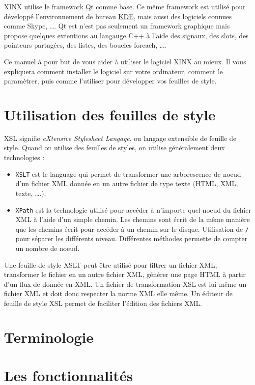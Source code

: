 \documentclass[a4paper,10pt,twoside]{book}
\begin{document}
XINX utilise le framework \href{http://qt.nokia.com}{Qt} comme base. Ce même framework est utilisé pour développé l'environnement de bureau \href{htpp://ww.kde.org}{KDE}, mais aussi des logiciels connues comme Skype, \ldots. Qt est n'est pas seulement un framework graphique mais propose quelques extentions au langauge C++ à l'aide des signaux, des slots, des pointeurs partagées, des listes, des boucles foreach, \ldots.

Ce manuel à pour but de vous aider à utiliser le logiciel XINX au mieux. Il vous expliquera comment installer le logiciel sur votre ordinateur, comment le paramètrer, puis comme l'utiliser pour développer vos feuilles de style.

\section{Utilisation des feuilles de style}

XSL signifie \emph{eXtensive Stylesheet Langage}, ou langage extensible de feuille de style. Quand on utilise des feuilles de styles, on utilise généralement deux technologies : 

\begin{itemize}
 \item \verb+XSLT+ est le language qui permet de transformer une arborescence de noeud d'un fichier XML donnée en un autre fichier de type texte (HTML, XML, texte, \dots.).
 \item \verb+XPath+ est la technologie utilisé pour accéder à n'importe quel noeud du fichier XML à l'aide d'un simple chemin. Les chemins sont écrit de la même manière que les chemins écrit pour accéder à un chemin sur le disque. Utilisation de \verb+/+ pour séparer les différents niveau. Différentes méthodes permette de compter un nombre de noeud.
\end{itemize}

Une feuille de style XSLT peut être utilisé pour filtrer un fichier XML, transformer le fichier en un autre fichier XML, générer une page HTML à partir d'un flux de donnée en XML. Un fichier de transformation XSL est lui même un fichier XML et doit donc respecter la norme XML elle même. Un éditeur de
feuille de style XSL permet de faciliter l'édition des fichiers XML.

\section{Terminologie}

\section{Les fonctionnalités}
\end{document}
